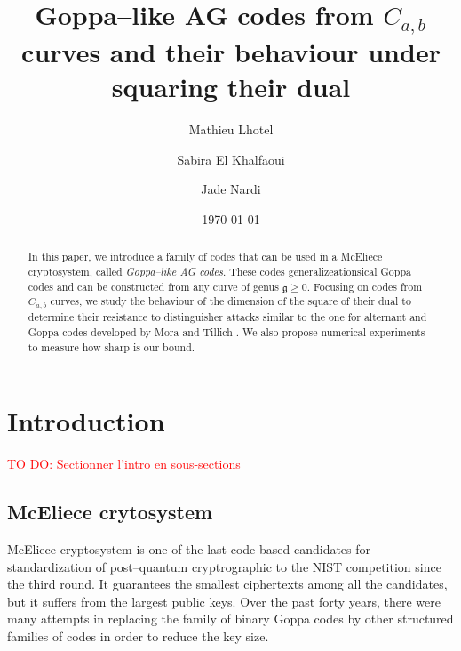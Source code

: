 \documentclass[a4paper]{amsart}
\title{Goppa--like AG codes from $C_{a,b}$ curves and their behaviour under squaring their dual}
\author{Mathieu Lhotel}
\author{Sabira El Khalfaoui}
\author{Jade Nardi}
\date{\today}
\theoremstyle{definition}
\theoremstyle{remark}
\newcommand\TODO[1]{\textcolor{red}{TO DO: #1}}
\begin{document}
\maketitle

\begin{abstract}
In this paper, we introduce a family of codes that can be used in a McEliece cryptosystem, called \emph{Goppa--like AG codes}. These codes generalizeationsical Goppa codes and can be constructed from any curve of genus $\mathfrak{g} \geq 0$. Focusing on codes from $C_{a,b}$ curves, we study the behaviour of the dimension of the square of their dual to determine their resistance to distinguisher attacks similar to the one for alternant and Goppa codes developed by Mora and Tillich \cite{MT21}. We also propose numerical experiments to measure how sharp is our bound.
\end{abstract}
 

\section*{Introduction}

\TODO{Sectionner l'intro en sous-sections}
\subsection*{McEliece crytosystem}
McEliece cryptosystem is one of the last code-based candidates for standardization of post--quantum cryptrographic to the NIST competition since the third round. It guarantees the smallest ciphertexts among all the candidates, but it suffers from the largest public keys. Over the past forty years, there were many attempts in replacing the family of binary Goppa codes by other structured families of codes in order to reduce the key size.
\end{document}

